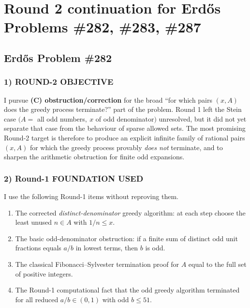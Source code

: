 \section*{Round 2 continuation for Erd\H{o}s Problems \#282, \#283, \#287}

\subsection*{Erd\H{o}s Problem \#282}

\subsubsection*{1) ROUND-2 OBJECTIVE}
I pursue \textbf{(C) obstruction/correction} for the broad ``for which pairs $(x,A)$ does the greedy process terminate?'' part of the problem. Round 1 left the Stein case $(A=$ all odd numbers$,\ x$ of odd denominator$)$ unresolved, but it did not yet separate that case from the behaviour of sparse allowed sets. The most promising Round-2 target is therefore to produce an explicit infinite family of rational pairs $(x,A)$ for which the greedy process provably \emph{does not} terminate, and to sharpen the arithmetic obstruction for finite odd expansions.

\subsubsection*{2) Round-1 FOUNDATION USED}
I use the following Round-1 items without reproving them.
\begin{enumerate}
\item The corrected \emph{distinct-denominator} greedy algorithm: at each step choose the least unused $n\in A$ with $1/n\le x$.
\item The basic odd-denominator obstruction: if a finite sum of distinct odd unit fractions equals $a/b$ in lowest terms, then $b$ is odd.
\item The classical Fibonacci--Sylvester termination proof for $A$ equal to the full set of positive integers.
\item The Round-1 computational fact that the odd greedy algorithm terminated for all reduced $a/b\in(0,1)$ with odd $b\le 51$.
\end{enumerate}

